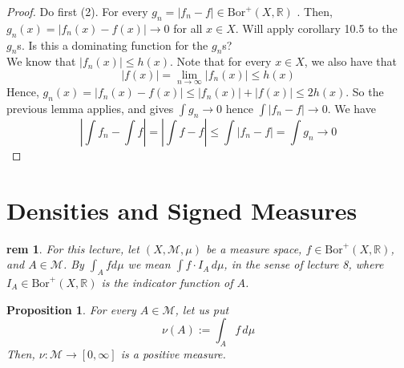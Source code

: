 \documentclass[letterpaper, 12pt]{article}
\newcommand{\fin}{\qquad \quad \hfill \framebox[1.75mm][l]{\,}}
\newcommand{\cM}{\mathcal{M}}
\newcommand{\bR}{\mathbb{R}}
\newcommand{\Bor}{\mathrm{Bor}}
\theoremstyle{stdthm}
\newtheorem{prop}[thm]{Proposition}
\theoremstyle{stddef}
\newtheorem{rem}[thm]{rem} %
\theoremstyle{stdnonum}
\theoremstyle{stdqands}
\theoremstyle{stdbold}
\begin{document}
\begin{proof}
Do first (2). For every $g_n = |f_n - f| \in \Bor^+(X,\bR)$ . Then, $g_n(x) = |f_n(x) - f(x)| \rightarrow 0$ for all $x \in X$. Will apply corollary 10.5 to the $g_n$s. Is this a dominating function for the $g_n$s? \\

We know that $|f_n(x)| \leq h(x)$. Note that for every $x \in X$, we also have that 
\[ |f(x)| = \lim_{n\rightarrow \infty} |f_n(x)| \leq h(x) \] 
Hence, $g_n(x) = |f_n(x) - f(x)| \leq |f_n(x)| + |f(x)|\leq 2h(x) $. So the previous lemma applies, and gives $\int g_n \rightarrow 0$ hence $\int |f_n - f| \rightarrow 0$. We have 
\[ |\int f_n - \int f| = |\int f - f | \leq \int |f_n - f| = \int g_n \rightarrow 0 \]
\end{proof}

\newpage


\section{Densities and Signed Measures}

\begin{rem}
For this lecture, let $(X,\cM,\mu)$ be a measure space, $f \in \Bor^+(X,\bR)$, and $A \in \cM$. By $\int_A f d\mu$ we mean $\int f \cdot I_A \, d\mu $, in the sense of lecture 8, where $I_A \in \Bor^+(X,\bR)$ is the indicator function of $A$. 
\end{rem}

\begin{prop}
For every $A \in \cM$, let us put 
\[ \nu(A) := \int_A f \, d\mu \]
Then, $\nu: \cM \rightarrow [0,\infty]$ is a positive measure. 
\end{prop}
\end{document}
